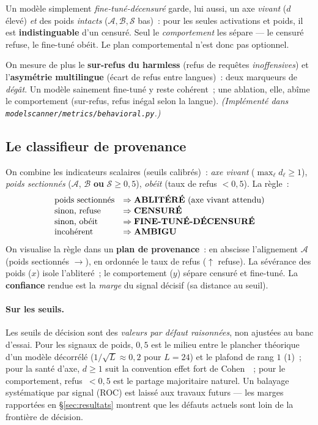 \documentclass[11pt,a4paper]{article}
\theoremstyle{definition}
\theoremstyle{plain}
\begin{document}
\begin{intuition}
Un modèle simplement \emph{fine-tuné-décensuré} garde, lui aussi, un axe \emph{vivant}
($d$ élevé) \emph{et} des poids \emph{intacts} ($\mathcal{A},\mathcal{B},\mathcal{S}$
bas)~: pour les seules activations et poids, il est \textbf{indistinguable} d'un
censuré. Seul le \emph{comportement} les sépare — le censuré refuse, le fine-tuné
obéit. Le plan comportemental n'est donc pas optionnel.
\end{intuition}

\noindent On mesure de plus le \textbf{sur-refus du harmless} (refus de requêtes
\emph{inoffensives}) et l'\textbf{asymétrie multilingue} (écart de refus entre
langues)~: deux marqueurs de \emph{dégât}. Un modèle sainement fine-tuné y reste
cohérent~; une ablation, elle, abîme le comportement (sur-refus, refus inégal selon la
langue). \emph{(Implémenté dans \texttt{modelscanner/metrics/behavioral.py}.)}

\subsection{Le classifieur de provenance}\label{sec:classif}
On combine les indicateurs scalaires (seuils calibrés)~: \emph{axe vivant}
($\max_\ell d_\ell\ge 1$), \emph{poids sectionnés} ($\mathcal{A}$, $\mathcal{B}$
\textbf{ou} $\mathcal{S}\ge 0{,}5$), \emph{obéit} (taux de refus $<0{,}5$). La règle~:
\[
\begin{array}{l@{\quad}l}
  \text{poids sectionnés} & \Rightarrow \textbf{ABLITÉRÉ}\ (\text{axe vivant attendu})\\
  \text{sinon, refuse} & \Rightarrow \textbf{CENSURÉ}\\
  \text{sinon, obéit} & \Rightarrow \textbf{FINE-TUNÉ-DÉCENSURÉ}\\
  \text{incohérent} & \Rightarrow \textbf{AMBIGU}
\end{array}
\]
On visualise la règle dans un \textbf{plan de provenance}~: en abscisse l'alignement
$\mathcal{A}$ (poids sectionnés $\rightarrow$), en ordonnée le taux de refus
($\uparrow$ refuse). La sévérance des poids ($x$) isole l'abliteré~; le comportement
($y$) sépare censuré et fine-tuné. La \textbf{confiance} rendue est la \emph{marge}
du signal décisif (sa distance au seuil).

\paragraph{Sur les seuils.} Les seuils de décision sont des \emph{valeurs par défaut
raisonnées}, non ajustées au banc d'essai. Pour les signaux de poids, $0{,}5$ est le
milieu entre le plancher théorique d'un modèle décorrélé ($1/\sqrt{L}\approx 0{,}2$
pour $L=24$) et le plafond de rang $1$ ($1$)~; pour la santé d'axe, $d\ge 1$ suit la
convention \og effet fort\fg{} de Cohen~\cite{cohen1988}~; pour le comportement,
refus~$<0{,}5$ est le partage majoritaire naturel. Un balayage systématique par signal
(ROC) est laissé aux travaux futurs --- les marges rapportées en
\S\ref{sec:resultats} montrent que les défauts actuels sont loin de la frontière de
décision.
\end{document}
